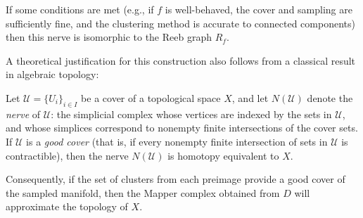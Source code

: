 If some conditions are met (e.g., if $f$ is 
well-behaved, the cover and sampling are sufficiently fine, and the clustering 
method is accurate to connected components) then this nerve is isomorphic to the Reeb 
graph $R_f$.

A theoretical justification for this construction also follows from a classical result 
in algebraic topology: 

\begin{definition}
Let $\mathcal{U} = \{ U_i \}_{i \in I}$ be a cover of a topological space $X$, 
and let $N(\mathcal{U})$ denote the \emph{nerve} of $\mathcal{U}$: the simplicial complex 
whose vertices are indexed by the sets in $\mathcal{U}$, and whose simplices correspond 
to nonempty finite intersections of the cover sets. If $\mathcal{U}$ is a \emph{good cover} 
(that is, if every nonempty finite intersection of sets in $\mathcal{U}$ is contractible), 
then the nerve $N(\mathcal{U})$ is homotopy equivalent to $X$.
\end{definition}

Consequently, if the set of clusters from each preimage provide a good cover 
of the sampled manifold, then the Mapper complex obtained from $D$ will approximate 
the topology of $X$. 
